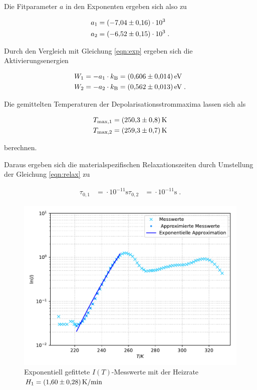 Die Fitparameter $a$ in den Exponenten ergeben sich also zu

\begin{align*}
  a_1 &= (\num{-7.04 +- 0.16})\cdot 10^3 \\
  a_2 &= (\num{-6.52 +- 0.15})\cdot 10^3  \; .
\end{align*}

Durch den Vergleich mit Gleichung \eqref{eqn:exp} ergeben sich die Aktivierungsenergien

\begin{align*}
  W_1 &= -a_1 \cdot k_\text{B} = \SI{0.606 +- 0.014}{\eV} \\
  W_2 &= -a_2 \cdot k_\text{B} = \SI{0.562 +- 0.013}{\eV}  \; .
\end{align*}

Die gemittelten Temperaturen der Depolarisationsstrommaxima lassen sich als

\begin{align*}
  T_\text{max,1} &= \SI{250.3 +- 0.8}{\kelvin} \\
  T_\text{max,2} &= \SI{259.3 +- 0.7}{\kelvin}
\end{align*}

berechnen.

Daraus ergeben sich die materialspezifischen Relaxationszeiten durch Umstellung der Gleichung \eqref{eqn:relax} zu

\begin{align*}
  \tau_{0,1} &= \num{} \cdot 10^{-11} \si{\second}
  \tau_{0,2} &= \num{} \cdot 10^{-11} \si{\second} \; .
\end{align*}


\begin{figure}
  \centering
  \includegraphics[scale=0.75]{content/plot1.pdf}
  \caption{Exponentiell gefittete $I(T)$-Messwerte mit der Heizrate $H_1 = \SI{1.60 +- 0.28}{\kelvin\per\minute}$}
  \label{fig:plot1}
\end{figure}

